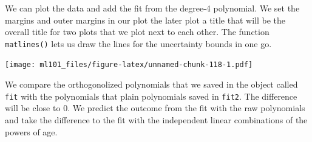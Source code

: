 \documentclass[]{article}
\newenvironment{Shaded}{\begin{snugshade}}{\end{snugshade}}
\newcommand{\CommentTok}[1]{\textcolor[rgb]{0.56,0.35,0.01}{\textit{#1}}}
\newcommand{\DataTypeTok}[1]{\textcolor[rgb]{0.13,0.29,0.53}{#1}}
\newcommand{\DecValTok}[1]{\textcolor[rgb]{0.00,0.00,0.81}{#1}}
\newcommand{\FloatTok}[1]{\textcolor[rgb]{0.00,0.00,0.81}{#1}}
\newcommand{\KeywordTok}[1]{\textcolor[rgb]{0.13,0.29,0.53}{\textbf{#1}}}
\newcommand{\NormalTok}[1]{#1}
\newcommand{\OperatorTok}[1]{\textcolor[rgb]{0.81,0.36,0.00}{\textbf{#1}}}
\newcommand{\OtherTok}[1]{\textcolor[rgb]{0.56,0.35,0.01}{#1}}
\newcommand{\StringTok}[1]{\textcolor[rgb]{0.31,0.60,0.02}{#1}}
\begin{document}
We can plot the data and add the fit from the degree-4 polynomial. We set the margins and outer margins in our plot the later plot a title that will be the overall title for two plots that we plot next to each other. The function \texttt{matlines()} lets us draw the lines for the uncertainty bounds in one go.

\begin{Shaded}
\end{Shaded}

\texttt{[image: ml101\_files/figure-latex/unnamed-chunk-118-1.pdf]}

We compare the orthogonolized polynomials that we saved in the object called \texttt{fit} with the polynomials that plain polynomials saved in \texttt{fit2}. The difference will be close to \(0\). We predict the outcome from the fit with the raw polynomials and take the difference to the fit with the independent linear combinations of the powers of age.
\end{document}
